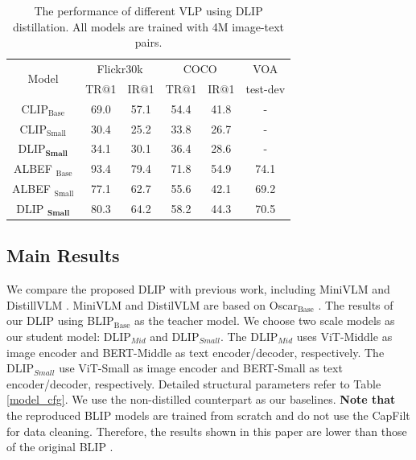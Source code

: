 \documentclass[10pt,twocolumn,letterpaper]{article}
\begin{document}
\begin{table}[t]
    \caption{The performance of different VLP using DLIP distillation. All models are trained with 4M image-text pairs.}
    \vspace{-5.0pt}
    \label{CLIP_result}
    \begin{center}
    \renewcommand\arraystretch{1.0}
    \setlength\tabcolsep{4.5pt}
    \begin{tabular}{c|cc|cc|c}
        \toprule
        \multirow{2}{1.5cm}{\centering Model}  & \multicolumn{2}{c|}{Flickr30k}  & \multicolumn{2}{c|}{COCO} &  \multicolumn{1}{c}{VOA} \\
         & TR$@$1 & IR$@$1 & TR$@$1 & IR$@$1 & test-dev    \\
        \toprule
        CLIP$_{\text{Base}}$   & 69.0 & 57.1 & 54.4 & 41.8 & -     \\
        CLIP$_{\text{Small}}$   & 30.4 & 25.2 & 33.8 & 26.7 & -     \\
        \rowcolor{gray!15}  DLIP$_{\textbf{Small}}$   & 34.1 & 30.1 & 36.4 & 28.6 & -     \\
        \midrule
        ALBEF $_{\text{Base}}$   & 93.4 & 79.4 & 71.8 & 54.9 & 74.1  \\
        ALBEF $_{\text{Small}}$  & 77.1 & 62.7 & 55.6 & 42.1 & 69.2   \\
        \rowcolor{gray!15}  DLIP $_{\textbf{Small}}$  & 80.3 & 64.2 & 58.2 & 44.3 & 70.5   \\
        \bottomrule 
    \end{tabular}
    \end{center}
    \vskip -0.2in
  \end{table}

\subsection{Main Results}
We compare the proposed DLIP with previous work, including MiniVLM \cite{wang2020minivlm} and DistillVLM \cite{fang2021compressing}. MiniVLM and DistilVLM are based on Oscar$_{\text{Base}}$ \cite{li2020oscar}. 
The results of our DLIP using BLIP$_{\text{Base}}$ \cite{li2022blip} as the teacher model. 
We choose two scale models as our student model: DLIP$_{Mid}$ and DLIP$_{Small}$.
The DLIP$_{Mid}$ uses ViT-Middle as image encoder and BERT-Middle as text encoder/decoder, respectively. The DLIP$_{Small}$ use ViT-Small as image encoder and BERT-Small as text encoder/decoder, respectively.
Detailed structural parameters refer to Table \ref{model_cfg}.
We use the non-distilled counterpart as our baselines.
\textbf{Note that} the reproduced BLIP models are trained from scratch and do not use the CapFilt \cite{li2022blip} for data cleaning. Therefore, the results shown in this paper are lower than those of the original BLIP \cite{li2022blip}.
\end{document}
